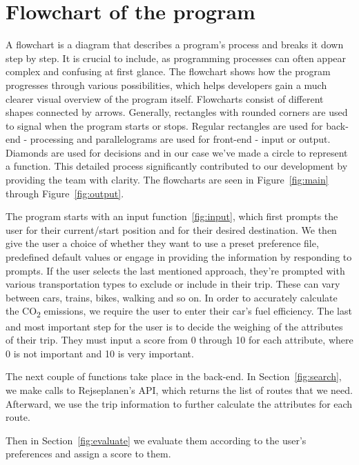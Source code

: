 \section{Flowchart of the program}

A flowchart is a diagram that describes a program's process and breaks it down step by step.
It is crucial to include, as programming processes can often appear complex and confusing at first glance.
The flowchart shows how the program progresses through various possibilities, which helps developers gain a much
clearer visual overview of the program itself.
Flowcharts consist of different shapes connected by arrows.
Generally, rectangles with rounded corners are used to signal when the program starts or stops.
Regular rectangles are used for back-end - processing and parallelograms are used for front-end - input or output.
Diamonds are used for decisions and in our case we've made a circle to represent a function.
This detailed process significantly contributed to our development by providing the team with clarity.
The flowcharts are seen in Figure~\ref{fig:main} through Figure~\ref{fig:output}.

The program starts with an input function~\ref{fig:input}, which first prompts the user for their current/start
position and for their desired destination.
We then give the user a choice of whether they want to use a preset preference file, predefined default values or engage
in providing the information by responding to prompts.
If the user selects the last mentioned approach, they're prompted with various transportation types to exclude or
include in their trip.
These can vary between cars, trains, bikes, walking and so on.
In order to accurately calculate the \unit{CO_{2}} emissions, we require the user to enter their car's fuel efficiency.
The last and most important step for the user is to decide the weighing of the attributes of their trip.
They must input a score from 0 through 10 for each attribute, where 0 is not important and 10 is very important.

The next couple of functions take place in the back-end.
In Section~\ref{fig:search}, we make calls to Rejseplanen's API, which returns the list of routes that we need.
Afterward, we use the trip information to further calculate the attributes for each route.

Then in Section~\ref{fig:evaluate} we evaluate them according to the user's preferences and assign a score to them.

